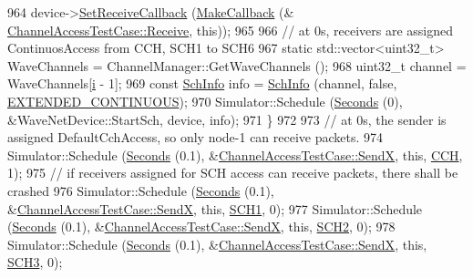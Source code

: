 \begin{DoxyCode}
964         device->\hyperlink{classns3_1_1WaveNetDevice_a98a6505182abba177a0ab348356301d8}{SetReceiveCallback} (\hyperlink{group__makecallbackmemptr_ga9376283685aa99d204048d6a4b7610a4}{MakeCallback} (&
      \hyperlink{classChannelAccessTestCase_ae5b3299c80154aa10c3775bfc4f8c0ab}{ChannelAccessTestCase::Receive}, \textcolor{keyword}{this}));
965 
966         \textcolor{comment}{// at 0s, receivers are assigned ContinuosAccess from CCH, SCH1 to SCH6}
967         \textcolor{keyword}{static} std::vector<uint32\_t> WaveChannels = ChannelManager::GetWaveChannels ();
968         uint32\_t channel = WaveChannels[\hyperlink{bernuolliDistribution_8m_a6f6ccfcf58b31cb6412107d9d5281426}{i} - 1];
969         \textcolor{keyword}{const} \hyperlink{structns3_1_1SchInfo}{SchInfo} info = \hyperlink{structns3_1_1SchInfo}{SchInfo} (channel, \textcolor{keyword}{false}, 
      \hyperlink{channel-scheduler_8h_a51fe3e802b9451e2893d55d591047fc1}{EXTENDED\_CONTINUOUS});
970         Simulator::Schedule (\hyperlink{group__timecivil_ga33c34b816f8ff6628e33d5c8e9713b9e}{Seconds} (0), &WaveNetDevice::StartSch, device, info);
971       \}
972 
973     \textcolor{comment}{// at 0s, the sender is assigned DefaultCchAccess, so only node-1 can receive packets.}
974     Simulator::Schedule (\hyperlink{group__timecivil_ga33c34b816f8ff6628e33d5c8e9713b9e}{Seconds} (0.1), &\hyperlink{classChannelAccessTestCase_a372d321c372c644c86ff355e94704eaf}{ChannelAccessTestCase::SendX}, \textcolor{keyword}{
      this}, \hyperlink{channel-manager_8h_a52d2f169cde2f6abe66ecc83f0d7ad80}{CCH}, 1);
975     \textcolor{comment}{// if receivers assigned for SCH access can receive packets, there shall be crashed}
976     Simulator::Schedule (\hyperlink{group__timecivil_ga33c34b816f8ff6628e33d5c8e9713b9e}{Seconds} (0.1), &\hyperlink{classChannelAccessTestCase_a372d321c372c644c86ff355e94704eaf}{ChannelAccessTestCase::SendX}, \textcolor{keyword}{
      this}, \hyperlink{channel-manager_8h_a456a1b730523e5d3b8a29fb227d10028}{SCH1}, 0);
977     Simulator::Schedule (\hyperlink{group__timecivil_ga33c34b816f8ff6628e33d5c8e9713b9e}{Seconds} (0.1), &\hyperlink{classChannelAccessTestCase_a372d321c372c644c86ff355e94704eaf}{ChannelAccessTestCase::SendX}, \textcolor{keyword}{
      this}, \hyperlink{channel-manager_8h_a07a0bff852fe2b8538a46d6e779546b6}{SCH2}, 0);
978     Simulator::Schedule (\hyperlink{group__timecivil_ga33c34b816f8ff6628e33d5c8e9713b9e}{Seconds} (0.1), &\hyperlink{classChannelAccessTestCase_a372d321c372c644c86ff355e94704eaf}{ChannelAccessTestCase::SendX}, \textcolor{keyword}{
      this}, \hyperlink{channel-manager_8h_ad3135bbb37bccc4d3d6a2bf4545cf7a5}{SCH3}, 0);

\end{DoxyCode}
